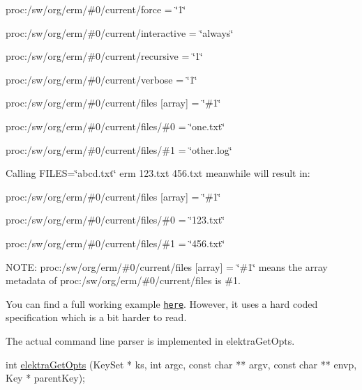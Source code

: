 \begin{DoxyItemize}
\item {\ttfamily proc\+:/sw/org/erm/\#0/current/force = \char`\"{}1\char`\"{}}
\item {\ttfamily proc\+:/sw/org/erm/\#0/current/interactive = \char`\"{}always\char`\"{}}
\item {\ttfamily proc\+:/sw/org/erm/\#0/current/recursive = \char`\"{}1\char`\"{}}
\item {\ttfamily proc\+:/sw/org/erm/\#0/current/verbose = \char`\"{}1\char`\"{}}
\item {\ttfamily proc\+:/sw/org/erm/\#0/current/files \mbox{[}array\mbox{]} = \char`\"{}\#1\char`\"{}}
\item {\ttfamily proc\+:/sw/org/erm/\#0/current/files/\#0 = \char`\"{}one.\+txt\char`\"{}}
\item {\ttfamily proc\+:/sw/org/erm/\#0/current/files/\#1 = \char`\"{}other.\+log\char`\"{}}
\end{DoxyItemize}

Calling {\ttfamily F\+I\+L\+ES=\char`\"{}abcd.\+txt\char`\"{} erm 123.\+txt 456.\+txt} meanwhile will result in\+:


\begin{DoxyItemize}
\item {\ttfamily proc\+:/sw/org/erm/\#0/current/files \mbox{[}array\mbox{]} = \char`\"{}\#1\char`\"{}}
\item {\ttfamily proc\+:/sw/org/erm/\#0/current/files/\#0 = \char`\"{}123.\+txt\char`\"{}}
\item {\ttfamily proc\+:/sw/org/erm/\#0/current/files/\#1 = \char`\"{}456.\+txt\char`\"{}}
\end{DoxyItemize}

N\+O\+TE\+: {\ttfamily proc\+:/sw/org/erm/\#0/current/files \mbox{[}array\mbox{]} = \char`\"{}\#1\char`\"{}} means the {\ttfamily array} metadata of {\ttfamily proc\+:/sw/org/erm/\#0/current/files} is {\ttfamily \#1}.

You can find a full working example \href{/home/jenkins/workspace/libelektra-release/examples/gopts.c}{\tt here}. However, it uses a hard coded specification which is a bit harder to read.

The actual command line parser is implemented in {\ttfamily elektra\+Get\+Opts}.


\begin{DoxyCode}
\textcolor{keywordtype}{int} \hyperlink{opts_8c_a9b60d56d97c918867960f19c19ab4058}{elektraGetOpts} (KeySet * ks, \textcolor{keywordtype}{int} argc, \textcolor{keyword}{const} \textcolor{keywordtype}{char} ** argv, \textcolor{keyword}{const} \textcolor{keywordtype}{char} ** envp, Key * 
      parentKey);
\end{DoxyCode}


